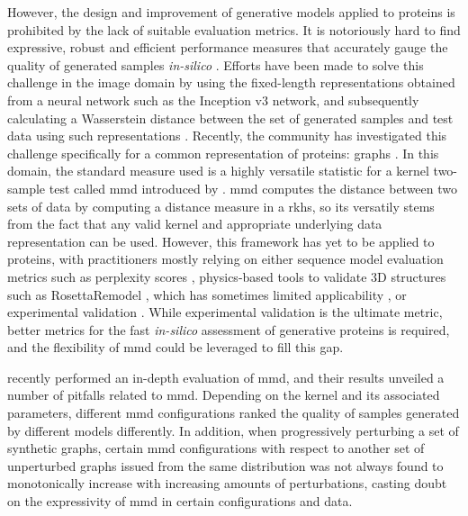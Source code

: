 However, the design and improvement of generative models applied to proteins is
prohibited by the lack of suitable evaluation metrics. It is notoriously hard to
find expressive, robust and efficient performance measures that accurately gauge
the quality of generated samples \emph{in-silico} \citep{theis2016note,
betzalel2022study}. Efforts have been made to solve this challenge in the image
domain by using the fixed-length representations obtained from a neural network
such as the Inception v3 network, and subsequently calculating a Wasserstein
distance between the set of generated samples and test data using such
representations \citep{heusel2017gans}. Recently, the community has investigated
this challenge specifically for a common representation of proteins: graphs
\citep{thompson2022evaluation, obray2022evaluation}. In this domain, the
standard measure used is a highly versatile statistic for a kernel two-sample
test called \acrfull{mmd} introduced by \cite{gretton2012kernel}. \gls{mmd}
computes the distance between two sets of data by computing a distance measure
in a \acrfull{rkhs}, so its versatily stems from the fact that any valid kernel
and appropriate underlying data representation can be used. However, this
framework has yet to be applied to proteins, with practitioners mostly relying
on either sequence model evaluation metrics such as perplexity scores
\citep{belinkov2019analysis,ingraham2019generative,hesslow2022rita},
physics-based tools to validate 3D structures such as RosettaRemodel
\citep{huang2011rosettaremodel, anand2018generative,ingraham2019generative},
which has sometimes limited applicability \citep{leman2020macromolecular}, or
experimental validation \citep{strokach2020fast}. While experimental validation
is the ultimate metric, better metrics for the fast \emph{in-silico} assessment
of generative proteins is required, and the flexibility of \gls{mmd} could be
leveraged to fill this gap.

\cite{obray2022evaluation} recently performed an in-depth evaluation of
\gls{mmd}, and their results unveiled a number of pitfalls related to
\gls{mmd}. Depending on the kernel and its associated parameters,
different \gls{mmd} configurations ranked the quality of samples generated
by different models differently. In addition, when progressively perturbing a
set of synthetic graphs, certain \gls{mmd} configurations with respect to
another set of unperturbed graphs issued from the same distribution was not
always found to monotonically increase with increasing amounts of perturbations,
casting doubt on the expressivity of \gls{mmd} in certain configurations
and data.

